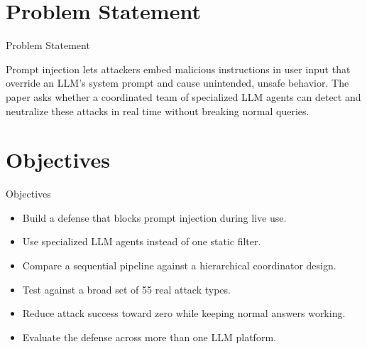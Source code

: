\documentclass[10pt]{beamer}
\begin{document}
\section{Problem Statement}
\begin{frame}{Problem Statement}
  \begin{block}{}
  Prompt injection lets attackers embed malicious instructions in user input that override an LLM's system prompt and cause unintended, unsafe behavior. The paper asks whether a coordinated team of specialized LLM agents can detect and neutralize these attacks in real time without breaking normal queries.
  \end{block}
\end{frame}
\section{Objectives}
\begin{frame}{Objectives}
\begin{itemize}
  \item Build a defense that blocks prompt injection during live use.
  \item Use specialized LLM agents instead of one static filter.
  \item Compare a sequential pipeline against a hierarchical coordinator design.
  \item Test against a broad set of 55 real attack types.
  \item Reduce attack success toward zero while keeping normal answers working.
  \item Evaluate the defense across more than one LLM platform.
\end{itemize}
\end{frame}
\end{document}
